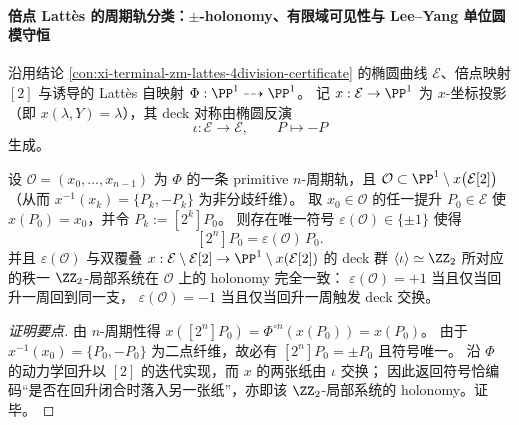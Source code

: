 \paragraph{倍点 Latt\`es 的周期轨分类：\texorpdfstring{$\pm$}{±}-holonomy、有限域可见性与 Lee--Yang 单位圆模守恒}
沿用结论 \ref{con:xi-terminal-zm-lattes-4division-certificate} 的椭圆曲线 \(\mathcal{E}\)、倍点映射 \([2]\) 与诱导的 Latt\`es 自映射 \(\Phi:\PP^{1}\dashrightarrow\PP^{1}\)。
记 \(x:\mathcal{E}\to\PP^{1}\) 为 \(x\)-坐标投影（即 \(x(\lambda,Y)=\lambda\)），其 deck 对称由椭圆反演
\[
\iota:\mathcal{E}\longrightarrow\mathcal{E},\qquad P\longmapsto -P
\]
生成。

\begin{conclusion}[Latt\`es 周期轨的 \texorpdfstring{$\ZZ_2$}{Z2}-holonomy 判别：\texorpdfstring{$[2^{n}]P=\pm P$}{[2^n]P=±P} 的等价刻画]\label{con:xi-terminal-zm-lattes-holonomy-sign-equivalence}
设 \(\mathcal{O}=(x_0,\dots,x_{n-1})\) 为 \(\Phi\) 的一条 primitive \(n\)-周期轨，且 \(\mathcal{O}\subset\PP^{1}\setminus x\bigl(\mathcal{E}[2]\bigr)\)（从而 \(x^{-1}(x_k)=\{P_k,-P_k\}\) 为非分歧纤维）。
取 \(x_0\in\mathcal{O}\) 的任一提升 \(P_0\in\mathcal{E}\) 使 \(x(P_0)=x_0\)，并令 \(P_k:=[2^{k}]P_0\)。
则存在唯一符号 \(\varepsilon(\mathcal{O})\in\{\pm1\}\) 使得
\[
[2^{n}]P_0=\varepsilon(\mathcal{O})\,P_0.
\]
并且 \(\varepsilon(\mathcal{O})\) 与双覆叠 \(x:\mathcal{E}\setminus\mathcal{E}[2]\to \PP^{1}\setminus x(\mathcal{E}[2])\) 的 deck 群 \(\langle\iota\rangle\simeq\ZZ_2\) 所对应的秩一 \(\ZZ_2\)-局部系统在 \(\mathcal{O}\) 上的 holonomy 完全一致：
\(\varepsilon(\mathcal{O})=+1\) 当且仅当回升一周回到同一支，
\(\varepsilon(\mathcal{O})=-1\) 当且仅当回升一周触发 deck 交换。
\end{conclusion}
\begin{proof}[证明要点]
由 \(n\)-周期性得 \(x([2^{n}]P_0)=\Phi^{\circ n}(x(P_0))=x(P_0)\)。
由于 \(x^{-1}(x_0)=\{P_0,-P_0\}\) 为二点纤维，故必有 \([2^{n}]P_0=\pm P_0\) 且符号唯一。
沿 \(\Phi\) 的动力学回升以 \([2]\) 的迭代实现，而 \(x\) 的两张纸由 \(\iota\) 交换；
因此返回符号恰编码“是否在回升闭合时落入另一张纸”，亦即该 \(\ZZ_2\)-局部系统的 holonomy。证毕。
\end{proof}


